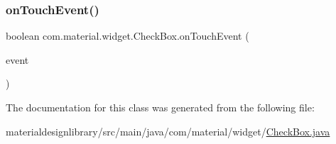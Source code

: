 \subsubsection{\texorpdfstring{on\+Touch\+Event()}{onTouchEvent()}}
{\footnotesize\ttfamily boolean com.\+material.\+widget.\+Check\+Box.\+on\+Touch\+Event (\begin{DoxyParamCaption}\item[{@Non\+Null Motion\+Event}]{event }\end{DoxyParamCaption})}



The documentation for this class was generated from the following file\+:\begin{DoxyCompactItemize}
\item 
materialdesignlibrary/src/main/java/com/material/widget/\hyperlink{_check_box_8java}{Check\+Box.\+java}\end{DoxyCompactItemize}
